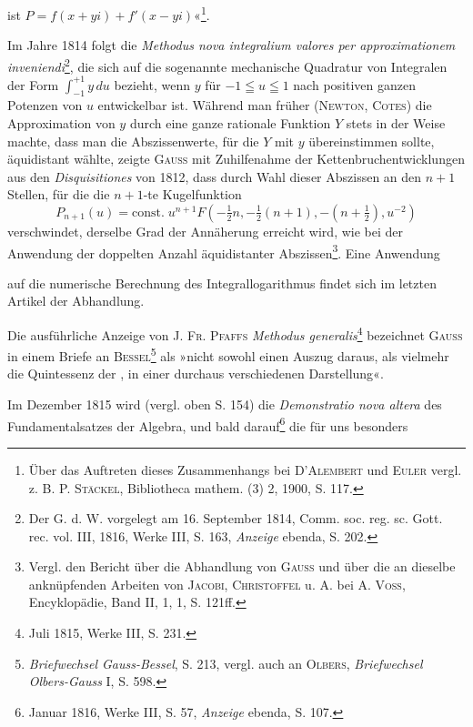 ist \(P=f(x+yi)+f'(x-yi)\)«\footnote{Über das Auftreten dieses Zusammenhangs bei \textsc{D'Alembert} und \textsc{Euler} vergl. z. B. P. \textsc{Stäckel}, Bibliotheca mathem. (3) 2, 1900, S. 117.}.
\par
Im Jahre 1814 folgt die \textit{Methodus nova integralium valores per approximationem
inveniendi}\footnote{Der G. d. W. vorgelegt am 16. September 1814, Comm. soc. reg. sc. Gott. rec. vol. III, 1816, Werke III, S. 163, \textit{Anzeige} ebenda, S. 202.}, die sich auf die sogenannte mechanische Quadratur von
Integralen der Form \(\displaystyle\int_{-1}^{+1}y\,du\) bezieht, wenn \(y\) für \(-1\leqq u\leqq1\) nach positiven
ganzen Potenzen von \(u\) entwickelbar ist. Während man früher (\textsc{Newton},
\textsc{Cotes}) die Approximation von \(y\) durch eine ganze rationale Funktion \(Y\) stets
in der Weise machte, dass man die Abszissenwerte, für die \(Y\) mit \(y\) übereinstimmen
sollte, äquidistant wählte, zeigte \textsc{Gauss} mit Zuhilfenahme der Kettenbruchentwicklungen
aus den \textit{Disquisitiones} von 1812, dass durch Wahl dieser
Abszissen an den \(n+1\) Stellen, für die die \(n+1\)-te Kugelfunktion
\[
P_{n+1}(u)=\mathrm{const.}\;u^{n+1}F(-\tfrac12n,-\tfrac12(n+1),-(n+\tfrac12),u^{-2})
\]
verschwindet, derselbe Grad der Annäherung erreicht wird, wie bei der Anwendung
der doppelten Anzahl äquidistanter Abszissen\footnote{Vergl. den Bericht über die Abhandlung von \textsc{Gauss} und über die an dieselbe anknüpfenden Arbeiten von \textsc{Jacobi}, \textsc{Christoffel} u. A. bei A. \textsc{Voss}, Encyklopädie, Band II, 1, 1, S. 121ff.}. Eine Anwendung\par
\clearpage{}
\noindent auf die numerische Berechnung des Integrallogarithmus findet sich im letzten
Artikel der Abhandlung.
\par
Die ausführliche Anzeige von J. \textsc{Fr. Pfaffs} \textit{Methodus generalis}\footnote{Juli 1815, Werke III, S. 231.} bezeichnet
\textsc{Gauss} in einem Briefe an \textsc{Bessel}\footnote{\textit{Briefwechsel Gauss-Bessel}, S. 213, vergl. auch an \textsc{Olbers}, \textit{Briefwechsel Olbers-Gauss} I, S. 598.} als »nicht sowohl einen Auszug
daraus, als vielmehr die Quintessenz der , in einer durchaus verschiedenen
Darstellung«.
\par
Im Dezember 1815 wird (vergl. oben S. 154) die \textit{Demonstratio nova altera}
des Fundamentalsatzes der Algebra, und bald darauf\footnote{Januar 1816, Werke III, S. 57, \textit{Anzeige} ebenda, S. 107.} die für uns besonders

